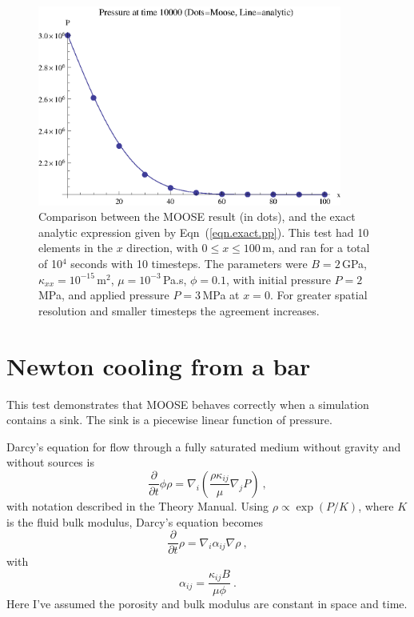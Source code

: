 \documentclass[]{scrreprt}
\begin{document}
\begin{figure}[htb]
\centering
\includegraphics[width=10cm]{pressure_pulse.eps}
\caption{Comparison between the MOOSE result (in dots), and the
  exact analytic expression given by Eqn~(\ref{eqn.exact.pp}).  This
  test had 10 elements in the $x$ direction, with $0\leq x \leq
  100$\,m, and ran for a total of 
  10$^4$ seconds with 10 timesteps.  The parameters were $B=2$\,GPa,
  $\kappa_{xx}=10^{-15}$\,m$^{2}$, $\mu=10^{-3}$\,Pa.s, $\phi=0.1$,
  with initial pressure $P=2$\,MPa, and applied pressure $P=3$\,MPa at
  $x=0$.  For greater spatial resolution and smaller timesteps the
  agreement increases.}
\label{pressure_pulse.fig}
\end{figure}



\chapter{Newton cooling from a bar}
\label{nc}

This test demonstrates that MOOSE behaves correctly when a simulation
contains a sink.  The sink is a piecewise linear function of pressure.

Darcy's equation for flow through a fully saturated medium without
gravity and without sources is 
\begin{equation}
\frac{\partial}{\partial t}\phi\rho = \nabla_{i}\left(\frac{\rho
  \kappa_{ij}}{\mu} \nabla_{j}P \right) \ ,
\end{equation}
with notation described in the Theory Manual.  Using $\rho \propto
\exp(P/K)$, where $K$ is the fluid bulk modulus, Darcy's equation
becomes
\begin{equation}
\frac{\partial}{\partial t}\rho = \nabla_{i}\alpha_{ij}\nabla\rho \ ,
\end{equation}
with 
\begin{equation}
\alpha_{ij} = \frac{\kappa_{ij}B}{\mu\phi} \ .
\end{equation}
Here I've assumed the porosity and bulk modulus are constant in space
and time.
\end{document}
